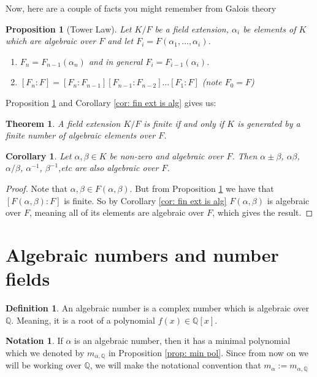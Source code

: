 \documentclass[11pt,a4paper]{report}
\theoremstyle{plain}
\newtheorem{theorem}[subsection]{Theorem}
\newtheorem{corollary}[subsection]{Corollary}
\newtheorem{prop}[subsection]{Proposition}
\theoremstyle{definition}
\newtheorem{definition}[subsection]{Definition}
\theoremstyle{definition}
\newtheorem{nota}[subsection]{Notation}
\def\QQ{\mathbb{Q}}
\def \a{\alpha}
\begin{document}
	Now, here are a couple of facts you might remember from Galois theory
	
	\begin{prop}[Tower Law]\label{prop: tower law}Let $K/F$ be a field extension, $\a_i$ be elements of $K$ which are algebraic over $F$ and let $F_i=F(\a_1,\dots,\a_i)$.
		\begin{enumerate}
			\item $F_n=F_{n-1}(\a_n)$ and in general $F_i=F_{i-1}(\a_i)$.
			\item  $[F_n:F]=[F_n:F_{n-1}][F_{n-1}:F_{n-2}]\dots[F_1:F]$ (note $F_0=F$)
		\end{enumerate}
	\end{prop}
	
	Proposition \ref{prop: tower law} and Corollary \ref{cor: fin ext is alg} gives us:
	
	\begin{theorem}\label{thm: fin ext iff alg}
		A field extension $K/F$ is finite if and only if $K$ is generated by a finite number of algebraic elements over $F$.
	\end{theorem}
	
	\begin{corollary}
		Let $\a,\beta \in K$ be non-zero and algebraic over $F$. Then $\a \pm \beta$, $\a\beta$, $\a/\beta$, $\a^{-1}$, $\beta^{-1}$,etc are also algebraic over $F$.
	\end{corollary}
	\begin{proof}
		Note that $\a, \beta \in F(\a,\beta)$. But from Proposition \ref{prop: tower law} we have  that $[F(\a,\beta):F]$ is finite. So by Corollary \ref{cor: fin ext is alg} $F(\a,\beta)$ is algebraic over $F$, meaning all of its elements are algebraic over $F$, which gives the result.
	\end{proof}
	
	\section{Algebraic numbers and number fields}
	
	\begin{definition}
		An algebraic number is a complex number which is algebraic over $\QQ$. Meaning, it is a root of a polynomial $f(x) \in \QQ[x]$.
	\end{definition}
	
	\begin{nota}
		If $\a$ is an algebraic number, then it has a minimal polynomial which we denoted by $m_{\a,\QQ}$ in Proposition \ref{prop: min pol}. Since from now on we will be working over $\QQ$, we will make the notational convention that $m_{\a}:=m_{\a,\QQ}$
	\end{nota}
	
\end{document}
